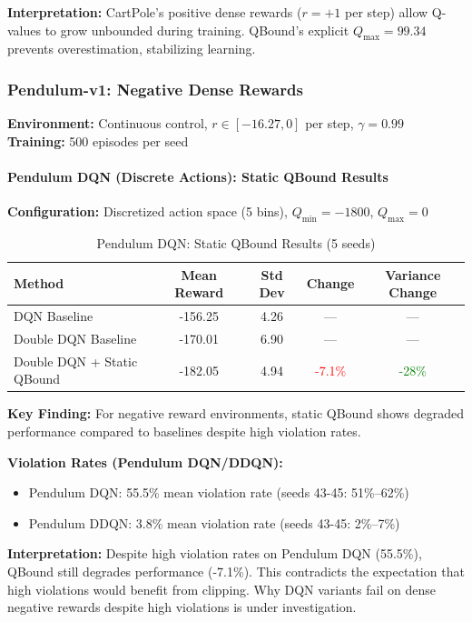 \documentclass[11pt]{article}
\theoremstyle{definition}
\theoremstyle{remark}
\begin{document}
\textbf{Interpretation:} CartPole's positive dense rewards ($r = +1$ per step) allow Q-values to grow unbounded during training. QBound's explicit $Q_{\max} = 99.34$ prevents overestimation, stabilizing learning.

\subsubsection{Pendulum-v1: Negative Dense Rewards}
\label{subsec:pendulum-results}

\textbf{Environment:} Continuous control, $r \in [-16.27, 0]$ per step, $\gamma = 0.99$ \\
\textbf{Training:} 500 episodes per seed

\paragraph{Pendulum DQN (Discrete Actions): Static QBound Results}

\textbf{Configuration:} Discretized action space (5 bins), $Q_{\min} = -1800$, $Q_{\max} = 0$

\begin{table}[h]
\centering
\caption{Pendulum DQN: Static QBound Results (5 seeds)}
\label{tab:pendulum-dqn}
\begin{tabular}{lcccc}
\toprule
Method & Mean Reward & Std Dev & Change & Variance Change \\
\midrule
DQN Baseline & -156.25 & 4.26 & --- & --- \\
\midrule
Double DQN Baseline & -170.01 & 6.90 & --- & --- \\
Double DQN + Static QBound & -182.05 & 4.94 & \textcolor{red}{-7.1\%} & \textcolor{green}{-28\%} \\
\bottomrule
\end{tabular}
\end{table}

\textbf{Key Finding:} For negative reward environments, static QBound shows degraded performance compared to baselines despite high violation rates.

\textbf{Violation Rates (Pendulum DQN/DDQN):}
\begin{itemize}
    \item Pendulum DQN: 55.5\% mean violation rate (seeds 43-45: 51\%--62\%)
    \item Pendulum DDQN: 3.8\% mean violation rate (seeds 43-45: 2\%--7\%)
\end{itemize}

\textbf{Interpretation:} Despite high violation rates on Pendulum DQN (55.5\%), QBound still degrades performance (-7.1\%). This contradicts the expectation that high violations would benefit from clipping. Why DQN variants fail on dense negative rewards despite high violations is under investigation.
\end{document}
